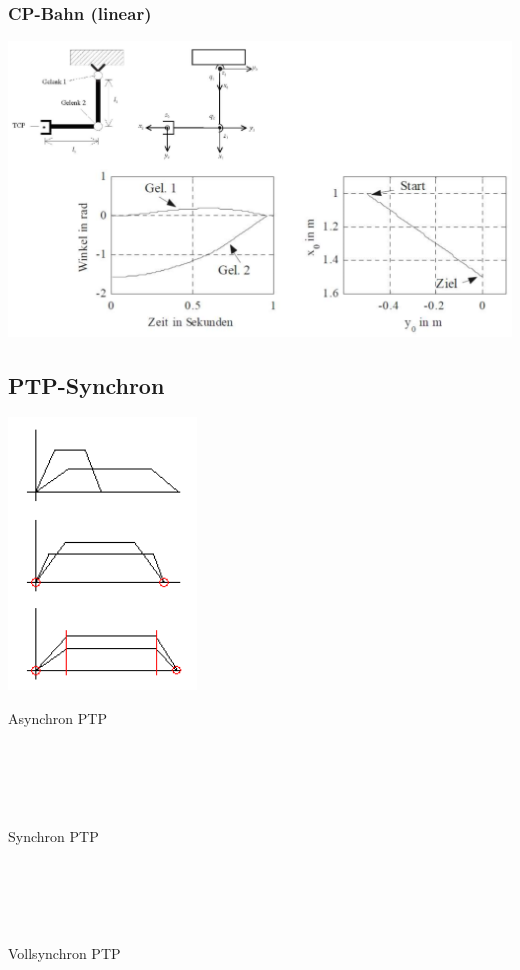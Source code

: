 \begin{multicols}{3}
\begin{minipage}{\linewidth}
        \subsubsection{CP-Bahn (linear)}
        \includegraphics[width=\linewidth]{./bilder/VBCPB}
    \end{minipage}
\end{multicols}

	\subsection{PTP-Synchron}
\begin{minipage}{6cm}
    \includegraphics[width=5cm]{./bilder/synchron}
\end{minipage}
\begin{minipage}{12.5cm}
    Asynchron PTP\\ \\ \\ \\ \\ \\
    Synchron PTP\\ \\ \\ \\ \\ \\
    Vollsynchron PTP\\
\end{minipage}